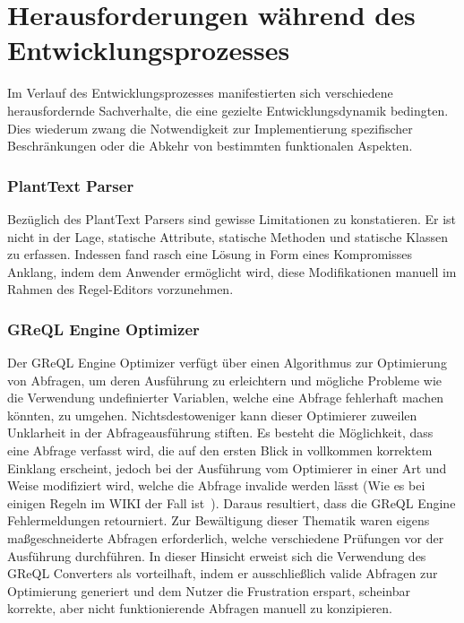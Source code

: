 \section{Herausforderungen während des Entwicklungsprozesses}

Im Verlauf des Entwicklungsprozesses manifestierten sich verschiedene herausfordernde Sachverhalte, die eine gezielte
Entwicklungsdynamik bedingten. Dies wiederum zwang die Notwendigkeit zur Implementierung spezifischer Beschränkungen
oder die Abkehr von bestimmten funktionalen Aspekten.

\subsubsection{PlantText Parser}

Bezüglich des PlantText Parsers sind gewisse Limitationen zu konstatieren. Er ist nicht in der Lage, statische
Attribute, statische Methoden und statische Klassen zu erfassen. Indessen fand rasch eine Lösung in Form eines
Kompromisses Anklang, indem dem Anwender ermöglicht wird, diese Modifikationen manuell im Rahmen des Regel-Editors
vorzunehmen.

\subsubsection{GReQL Engine Optimizer}

Der GReQL Engine Optimizer  verfügt über einen Algorithmus zur Optimierung von Abfragen, um deren Ausführung zu
erleichtern und mögliche Probleme wie die Verwendung undefinierter Variablen, welche eine Abfrage fehlerhaft machen
könnten, zu umgehen. Nichtsdestoweniger kann dieser Optimierer zuweilen Unklarheit in der Abfrageausführung stiften.
Es besteht die Möglichkeit, dass eine Abfrage verfasst wird, die auf den ersten Blick in vollkommen korrektem Einklang
erscheint, jedoch bei der Ausführung vom Optimierer in einer Art und Weise modifiziert wird, welche die Abfrage invalide
werden lässt (Wie es bei einigen Regeln im WIKI der Fall ist~\cite{GReQL-wiki}). Daraus resultiert, dass die GReQL Engine
Fehlermeldungen retourniert. Zur Bewältigung dieser Thematik waren eigens maßgeschneiderte Abfragen erforderlich, welche
verschiedene Prüfungen vor der Ausführung durchführen. In dieser Hinsicht erweist sich die Verwendung des GReQL
Converters als vorteilhaft, indem er ausschließlich valide Abfragen zur Optimierung generiert und dem Nutzer die
Frustration erspart, scheinbar korrekte, aber nicht funktionierende Abfragen manuell zu konzipieren.


